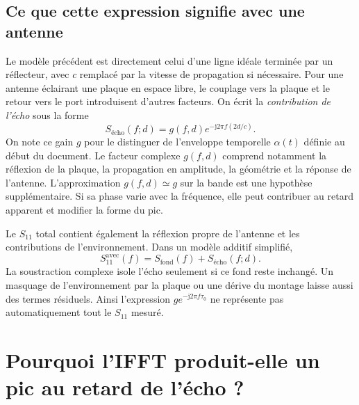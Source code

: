 \documentclass[11pt,a4paper]{article}
\newcommand{\jj}{\mathrm{j}}
\begin{document}
\subsection{Ce que cette expression signifie avec une antenne}
Le modèle précédent est directement celui d'une ligne idéale terminée par
un réflecteur, avec $c$ remplacé par la vitesse de propagation si nécessaire.
Pour une antenne éclairant une plaque en espace libre, le couplage vers la
plaque et le retour vers le port introduisent d'autres facteurs. On écrit
la \emph{contribution de l'écho} sous la forme
\begin{equation}
 S_{\text{écho}}(f;d)=g(f,d)e^{-\jj2\pi f(2d/c)}.
\end{equation}
On note ce gain $g$ pour le distinguer de l'enveloppe temporelle
$\alpha(t)$ définie au début du document.
Le facteur complexe $g(f,d)$ comprend notamment la réflexion de la
plaque, la propagation en amplitude, la géométrie et la réponse de l'antenne.
L'approximation $g(f,d)\simeq g$ sur la bande est une hypothèse
supplémentaire. Si sa phase varie avec la fréquence, elle peut contribuer
au retard apparent et modifier la forme du pic.

Le $S_{11}$ total contient également la réflexion propre de l'antenne et
les contributions de l'environnement. Dans un modèle additif simplifié,
\begin{equation}
 S_{11}^{\mathrm{avec}}(f)=S_{\mathrm{fond}}(f)
 +S_{\text{écho}}(f;d).
\end{equation}
La soustraction complexe isole l'écho seulement si ce fond reste inchangé.
Un masquage de l'environnement par la plaque ou une dérive du montage
laisse aussi des termes résiduels. Ainsi l'expression
$g e^{-\jj2\pi f\tau_0}$ ne représente pas automatiquement tout le
$S_{11}$ mesuré.

\section{Pourquoi l'IFFT produit-elle un pic au retard de l'écho ?}
\end{document}
